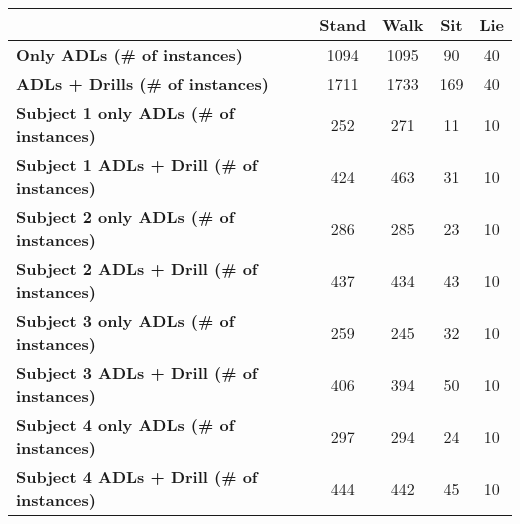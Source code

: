 \begin{table}
\centering
\begin{tabular}{|l|c|c|c|c|}
\hline
&\textbf{Stand}&\textbf{Walk}&\textbf{Sit}&\textbf{Lie}\\\hline
\textbf{Only ADLs (# of instances)}&1094&1095&90&40\\\hline
\textbf{ADLs + Drills (# of instances)}&1711&1733&169&40\\\hline
\textbf{Subject 1 only ADLs (# of instances)}&252&271&11&10\\\hline
\textbf{Subject 1 ADLs + Drill (# of instances)}&424&463&31&10\\\hline
\textbf{Subject 2 only ADLs (# of instances)}&286&285&23&10\\\hline
\textbf{Subject 2 ADLs + Drill (# of instances)}&437&434&43&10\\\hline
\textbf{Subject 3 only ADLs (# of instances)}&259&245&32&10\\\hline
\textbf{Subject 3 ADLs + Drill (# of instances)}&406&394&50&10\\\hline
\textbf{Subject 4 only ADLs (# of instances)}&297&294&24&10\\\hline
\textbf{Subject 4 ADLs + Drill (# of instances)}&444&442&45&10\\\hline
\end{tabular}
\caption{}
\end{table}